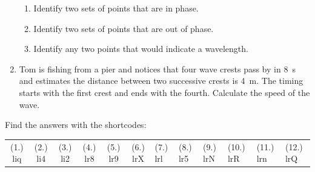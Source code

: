 \begin{enumerate}[noitemsep, label=\textbf{\arabic*}. ]
\begin{figure}[H]
\begin{center}
      \vspace{2pt}
    \vspace{.1in}
    \end{center}
 \end{figure}       \label{m38806*id321157}\begin{enumerate}[noitemsep, label=\textbf{\alph*}. ] 
            \label{m38806*uid55}\item Identify two sets of points that are in phase.
\label{m38806*uid56}\item Identify two sets of points that are out of phase.
\label{m38806*uid57}\item Identify any two points that would indicate a wavelength.
\end{enumerate}
                \label{m38806*uid58}\item Tom is fishing from a pier and notices that four wave crests pass by in 8~s and estimates the distance between two successive crests is 4~m. The timing starts with the first crest and ends with the fourth. Calculate the speed of the wave.\newline
\end{enumerate}
\par {} Find the answers with the shortcodes:
 \par \begin{tabular}[h]{cccccc}
 (1.) liq  &  (2.) li4  &  (3.) li2  &  (4.) lr8  &  (5.) lr9  &  (6.) lrX  &  (7.) lrl  &  (8.) lr5  &  (9.) lrN  &  (10.) lrR  &  (11.) lrn  &  (12.) lrQ  & \end{tabular}
